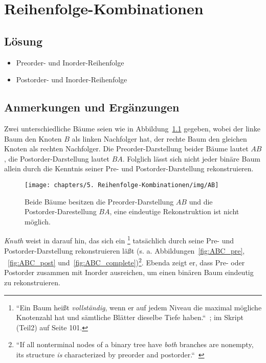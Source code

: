 \chapter{Reihenfolge-Kombinationen}

\section*{Lösung}

\begin{itemize}
    \item Preorder- und Inorder-Reihenfolge
    \item Postorder- und Inorder-Reihenfolge
\end{itemize}


\section*{Anmerkungen und Ergänzungen}

Zwei unterschiedliche Bäume seien wie in Abbildung~\ref{fig:AB} gegeben, wobei der linke Baum den Knoten $B$ als linken
Nachfolger hat, der rechte Baum den gleichen Knoten als rechten Nachfolger.
Die Preorder-Darstellung beider Bäume lautet $AB$, die Postorder-Darstellung lautet $BA$.
Folglich lässt sich nicht jeder binäre Baum allein durch die Kenntnis seiner Pre- und Postorder-Darstellung  rekonstruieren.

\begin{figure}[h]
    \centering
    \texttt{[image: chapters/5. Reihenfolge-Kombinationen/img/AB]}
    \caption{Beide Bäume besitzen die Preorder-Darstellung $AB$ und die Postorder-Darestellung $BA$, eine eindeutige Rekonstruktion ist nicht möglich.}
    \label{fig:AB}
\end{figure}

\textit{Knuth} weist in \cite[564]{Knu97} darauf hin, das sich ein \footnote{
    ``Ein Baum heißt \textit{vollständig}, wenn er auf jedem Niveau die maximal mögliche Knotenzahl hat und sämtliche Blätter dieselbe Tiefe haben.``~\cite[261, Hervorhebungen i.O.]{OW17e}; im Skript (Teil2) auf Seite 101.
} tatsächlich durch seine Pre- und Postorder-Darstellung rekonstruieren läßt ({s. a.} Abbildungen~\ref{fig:ABC_pre}, ~\ref{fig:ABC_post} und~\ref{fig:ABC_complete})\footnote{
    ``If all nonterminal nodes of a binary tree have \textit{both} branches are nonempty, its structure \textit{is} characterized by preorder and postorder.``~\cite[564, 7., Hervorhebungen i.O.]{Knu97}
}.
Ebenda zeigt er, dass Pre- oder Postorder zusammen mit Inorder ausreichen, um einen binären Baum eindeutig zu rekonstruieren.

